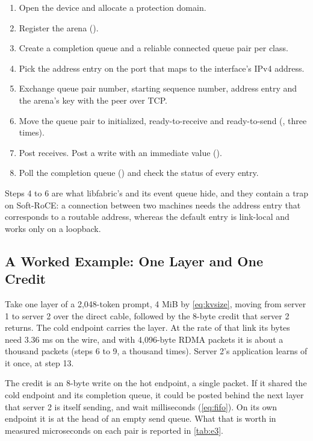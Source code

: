 \begin{enumerate}
  \item Open the device and allocate a protection domain.
  \item Register the arena ().
  \item Create a completion queue and a reliable connected queue pair per
        class.
  \item Pick the address entry on the port that maps to the interface's IPv4
        address.
  \item Exchange queue pair number, starting sequence number, address entry
        and the arena's key with the peer over TCP.
  \item Move the queue pair to initialized, ready-to-receive and
        ready-to-send (, three times).
  \item Post receives. Post a write with an immediate value
        ().
  \item Poll the completion queue () and check the status
        of every entry.
\end{enumerate}

Steps 4 to 6 are what libfabric's  and its event queue hide,
and they contain a trap on Soft-RoCE: a connection between two machines needs
the address entry that corresponds to a routable address, whereas the default
entry is link-local and works only on a loopback.

\subsection{A Worked Example: One Layer and One Credit}

Take one layer of a 2,048-token prompt, 4 MiB by \cref{eq:kvsize}, moving
from server 1 to server 2 over the direct cable, followed by the 8-byte
credit that server 2 returns. The cold endpoint carries the layer. At the
rate of that link its bytes need 3.36 ms on the wire, and with
4,096-byte RDMA packets it is about a thousand packets (steps 6 to 9, a
thousand times). Server 2's application learns of it once, at step 13.

The credit is an 8-byte write on the hot endpoint, a single packet. If it shared the
cold endpoint and its completion queue, it could be posted behind the next
layer that server 2 is itself sending, and wait milliseconds
(\cref{eq:fifo}). On its own endpoint it is at the head of an empty send
queue. What that is worth in measured microseconds on each pair is reported
in \cref{tab:e3}.

